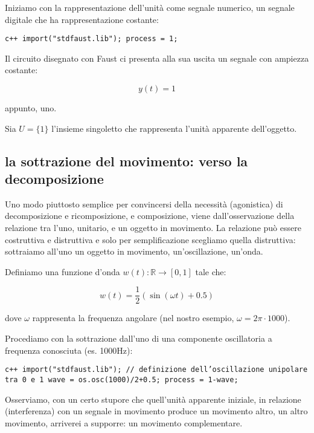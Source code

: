 \documentclass[a4paper,11pt]{article}
\begin{document}
Iniziamo con la rappresentazione dell'unità come segnale numerico,
un segnale digitale che ha rappresentazione costante:

\texttt{c++
import("stdfaust.lib");
process = 1;
}

Il circuito disegnato con Faust ci presenta alla sua uscita un segnale
con ampiezza costante:

\begin{displaymath}
y(t)=1
\end{displaymath}

appunto, uno.

Sia $U = \{1\}$ l'insieme singoletto che rappresenta l'unità apparente
dell'oggetto.

\subsection{la sottrazione del movimento: verso la decomposizione}\hypertarget{la-sottrazione-del-movimento-verso-la-decomposizione}{}\label{la-sottrazione-del-movimento-verso-la-decomposizione}

Uno modo piuttosto semplice per convincersi della necessità (agonistica)
di decomposizione e ricomposizione, e composizione, viene
dall'osservazione della relazione tra l'uno, unitario, e un oggetto in
movimento. La relazione può essere costruttiva e distruttiva e solo per
semplificazione scegliamo quella distruttiva: sottraiamo all'uno
un oggetto in movimento, un'oscillazione, un'onda.

Definiamo una funzione d'onda $w(t): \mathbb{R} \to [0,1]$ tale che:

\begin{displaymath}
w(t) = \frac{1}{2}(\sin(\omega t) + 0.5)
\end{displaymath}

dove $\omega$ rappresenta la frequenza angolare (nel nostro esempio,
$\omega = 2\pi \cdot 1000$).

Procediamo con la sottrazione dall'uno di una componente oscillatoria a
frequenza conosciuta (es. 1000Hz):

\texttt{c++
import("stdfaust.lib");
// definizione dell'oscillazione unipolare tra 0 e 1
wave = os.osc(1000)/2+0.5;
process = 1-wave;
}

Osserviamo, con un certo stupore che quell'unità apparente iniziale,
in relazione (interferenza) con un segnale in movimento produce un
movimento altro, un altro movimento, arriverei a supporre:
un movimento complementare.
\end{document}
